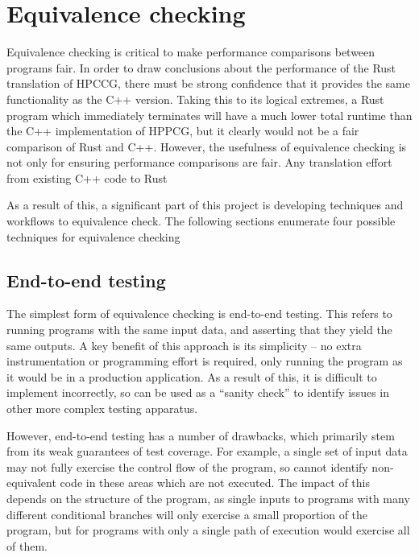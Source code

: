 \section{Equivalence checking}
\label{sec:equivalence-checking} %

Equivalence checking is critical to make performance comparisons between programs fair. In order to draw conclusions about the performance of the Rust translation of HPCCG, there must be strong confidence that it provides the same functionality as the C++ version. Taking this to its logical extremes, a Rust program which immediately terminates will have a much lower total runtime than the C++ implementation of HPPCG, but it clearly would not be a fair comparison of Rust and C++. However, the usefulness of equivalence checking is not only for ensuring performance comparisons are fair. Any translation effort from existing C++ code to Rust 

As a result of this, a significant part of this project is developing techniques and workflows to equivalence check. The following sections enumerate four possible techniques for equivalence checking 

\subsection{End-to-end testing}
\label{sec:equivalence-end-to-end}

The simplest form of equivalence checking is end-to-end testing. This refers to running programs with the same input data, and asserting that they yield the same outputs. A key benefit of this approach is its simplicity -- no extra instrumentation or programming effort is required, only running the program as it would be in a production application. As a result of this, it is difficult to implement incorrectly, so can be used as a ``sanity check'' to identify issues in other more complex testing apparatus.

However, end-to-end testing has a number of drawbacks, which primarily stem from its weak guarantees of test coverage. For example, a single set of input data may not fully exercise the control flow of the program, so cannot identify non-equivalent code in these areas which are not executed. The impact of this depends on the structure of the program, as single inputs to programs with many different conditional branches will only exercise a small proportion of the program, but for programs with only a single path of execution would exercise all of them.


